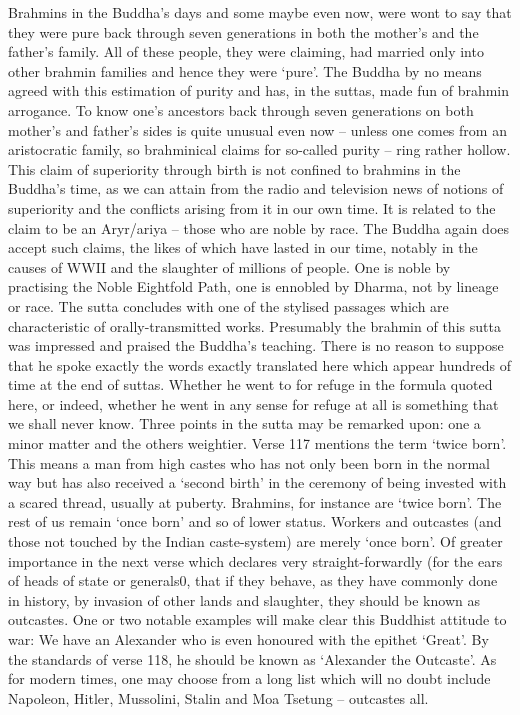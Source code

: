 Brahmins in the Buddha's days and some maybe even now, were wont to say that they were pure back through seven generations in both the mother's and the father's family. All of these people, they were claiming, had married only into other brahmin families and hence they were `pure'. The Buddha by no means agreed with this estimation of purity and has, in the suttas, made fun of brahmin arrogance. To know one's ancestors back through seven generations on both mother's and father's sides is quite unusual even now – unless one comes from an aristocratic family, so brahminical claims for so-called purity – ring rather hollow. This claim of superiority through birth is not confined to brahmins in the Buddha's time, as we can attain from the radio and television news of notions of superiority and the conflicts arising from it in our own time.
It is related to the claim to be an Aryr/ariya – those who are noble by race. The Buddha again does accept such claims, the likes of which have lasted in our time, notably in the causes of WWII and the slaughter of millions of people. One is noble by practising the Noble Eightfold Path, one is ennobled by Dharma, not by lineage or race.
The sutta concludes with one of the stylised passages which are characteristic of orally-transmitted works. Presumably the brahmin of this sutta was impressed and praised the Buddha's teaching. There is no reason to suppose that he spoke exactly the words exactly translated here which appear hundreds of time at the end of suttas. Whether he went to for refuge in the formula quoted here, or indeed, whether he went in any sense for refuge at all is something that we shall never know.
Three points in the sutta may be remarked upon: one a minor matter and the others weightier. Verse 117 mentions the term `twice born'. This means a man from high castes who has not only been born in the normal way but has also received a `second birth' in the ceremony of being invested with a scared thread, usually at puberty. Brahmins, for instance are `twice born'. The rest of us remain `once born' and so of lower status. Workers and outcastes (and those not touched by the Indian caste-system) are merely `once born'.
Of greater importance in the next verse which declares very straight-forwardly (for the ears of heads of state or generals0, that if they behave, as they have commonly done in history, by invasion of other lands and slaughter, they should be known as outcastes. One or two notable examples will make clear this Buddhist attitude to war: We have an Alexander who is even honoured with the epithet `Great'. By the standards of verse 118, he should be known as `Alexander the Outcaste'. As for modern times, one may choose from a long list which will no doubt include Napoleon, Hitler, Mussolini, Stalin and Moa Tsetung – outcastes all.
